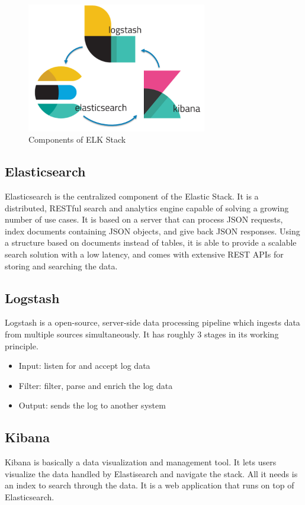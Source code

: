 \documentclass{report}
\begin{document}
\begin{figure}[h]
	\centering
	\includegraphics[width=0.7\textwidth]{Images/ELK.png}
	\caption{Components of ELK Stack}
	\label{fig:ELK Stack}
\end{figure}

\subsection*{Elasticsearch}
Elasticsearch is the centralized component of the Elastic Stack.
It is a distributed, RESTful search and analytics engine capable of solving a growing number of use cases.
It is based on a server that can process JSON requests, index documents containing JSON objects, and give back JSON responses.
Using a structure based on documents instead of tables, it is able to provide a scalable search solution with a low latency, and 
comes with extensive REST APIs for storing and searching the data.

\subsection*{Logstash}
Logstash is a open-source, server-side data processing pipeline which ingests data from multiple sources simultaneously. 
It has roughly 3 stages in its working principle.
\begin{itemize}
	\item Input: listen for and accept log data
	\item Filter: filter, parse and enrich the log data
	\item Output: sends the log to another system
\end{itemize}

\subsection*{Kibana}
Kibana is basically a data visualization and management tool. It lets users visualize the data handled by Elastisearch and 
navigate the stack. All it needs is an index to search through the data. 
It is a web application that runs on top of Elasticsearch.
\end{document}
